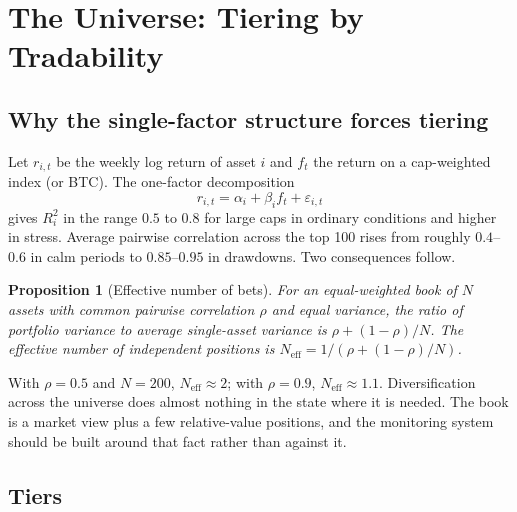 \documentclass[11pt,a4paper]{article}
\newtheorem{proposition}{Proposition}[section]
\theoremstyle{definition}
\begin{document}
\section{The Universe: Tiering by Tradability}\label{sec:universe}

\subsection{Why the single-factor structure forces tiering}

Let $r_{i,t}$ be the weekly log return of asset $i$ and $f_t$ the return on a cap-weighted index (or BTC). The one-factor decomposition
\begin{equation}
r_{i,t} = \alpha_i + \beta_i f_t + \varepsilon_{i,t}
\end{equation}
gives $R^2_i$ in the range $0.5$ to $0.8$ for large caps in ordinary conditions and higher in stress. Average pairwise correlation across the top 100 rises from roughly $0.4$--$0.6$ in calm periods to $0.85$--$0.95$ in drawdowns. Two consequences follow.

\begin{proposition}[Effective number of bets]
For an equal-weighted book of $N$ assets with common pairwise correlation $\rho$ and equal variance, the ratio of portfolio variance to average single-asset variance is $\rho + (1-\rho)/N$. The effective number of independent positions is $N_{\mathrm{eff}} = 1/(\rho + (1-\rho)/N)$.
\end{proposition}
With $\rho = 0.5$ and $N = 200$, $N_{\mathrm{eff}} \approx 2$; with $\rho = 0.9$, $N_{\mathrm{eff}} \approx 1.1$. Diversification across the universe does almost nothing in the state where it is needed. The book is a market view plus a few relative-value positions, and the monitoring system should be built around that fact rather than against it.

\subsection{Tiers}
\end{document}

